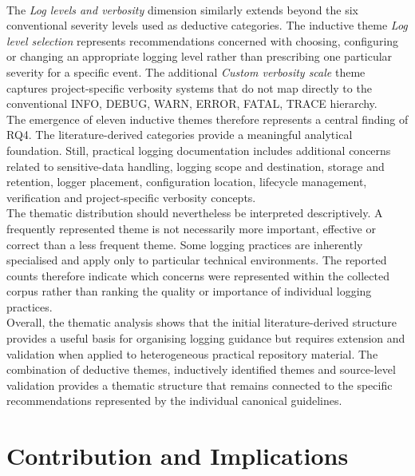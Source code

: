 \\
The \textit{Log levels and verbosity} dimension similarly extends beyond the six conventional severity levels used as deductive categories. 
The inductive theme \textit{Log level selection} represents recommendations concerned with choosing, configuring or changing an appropriate logging level rather than prescribing one particular severity for a specific event. 
The additional \textit{Custom verbosity scale} theme captures project-specific verbosity systems that do not map directly to the conventional INFO, DEBUG, WARN, ERROR, FATAL, TRACE hierarchy.
\\
The emergence of eleven inductive themes therefore represents a central finding of RQ4. 
The literature-derived categories provide a meaningful analytical foundation.
Still, practical logging documentation includes additional concerns related to sensitive-data handling, logging scope and destination, storage and retention, logger placement, configuration location, lifecycle management, verification and project-specific verbosity concepts.
\\
The thematic distribution should nevertheless be interpreted descriptively. 
A frequently represented theme is not necessarily more important, effective or correct than a less frequent theme. 
Some logging practices are inherently specialised and apply only to particular technical environments. 
The reported counts therefore indicate which concerns were represented within the collected corpus rather than ranking the quality or importance of individual logging practices.
\\
Overall, the thematic analysis shows that the initial literature-derived structure provides a useful basis for organising logging guidance but requires extension and validation when applied to heterogeneous practical repository material. 
The combination of deductive themes, inductively identified themes and source-level validation provides a thematic structure that remains connected to the specific recommendations represented by the individual canonical guidelines.

\section{Contribution and Implications}

